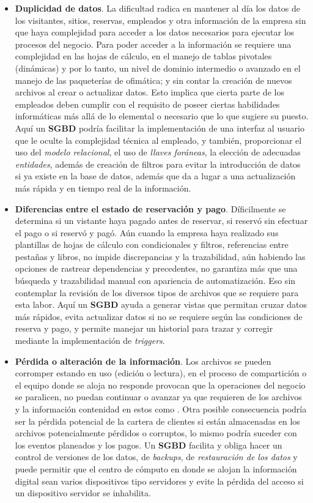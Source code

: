 \documentclass[12pt]{article}
\begin{document}
\begin{itemize}
	\item \textbf{Duplicidad de datos}. La dificultad radica en mantener al día los datos de los visitantes, sitios, reservas, empleados y otra información de la empresa sin que haya complejidad para acceder a los datos necesarios para ejecutar los procesos del negocio. Para poder acceder a la información se requiere una complejidad en las hojas de cálculo, en el manejo de tablas pivotales (dinámicas) y por lo tanto, un nivel de dominio intermedio o avanzado en el manejo de las paqueterías de ofimática; y sin contar la creación de nuevos archivos al crear o actualizar datos. Esto implica que cierta parte de los empleados deben cumplir con el requisito de poseer ciertas habilidades informáticas más allá de lo elemental o necesario que lo que sugiere su puesto. Aquí un \textbf{SGBD} podría facilitar la implementación de una interfaz al usuario que le oculte la complejidad técnica al empleado, y también, proporcionar el uso del \textit{modelo relacional}, el uso de \textit{llaves foráneas}, la elección de adecuadas \textit{entidades}, además de creación de filtros para evitar la introducción de datos si ya existe en la base de datos, además que da a lugar a una actualización más rápida y en tiempo real de la información.
	\item \textbf{Diferencias entre el estado de reservación y pago}. Díficilmente se determina si un vistante haya pagado antes de reservar, si reservó sin efectuar el pago o si reservó y pagó. Aún cuando la empresa haya realizado sus plantillas de hojas de cálculo con condicionales y filtros, referencias entre pestañas y libros, no impide discrepancias y la trazabilidad, aún habiendo las opciones de rastrear dependencias y precedentes, no garantiza más que una búsqueda y trazabilidad manual con apariencia de automatización. Eso sin contemplar la revisión de los diversos tipos de archivos que se requiere para esta labor. Aquí un  \textbf{SGBD} ayuda a generar vistas que permitan cruzar datos más rápidos, evita actualizar datos si no se requiere según las condiciones de reserva y pago, y permite manejar un historial para trazar y corregir mediante la implementación de \textit{triggers}.
	\item \textbf{Pérdida o alteración de la información}. Los archivos se pueden corromper estando en uso (edición o lectura), en el proceso de compartición o el equipo donde se aloja no responde provocan que la operaciones del negocio se paralicen, no puedan continuar o avanzar ya que requieren de los archivos y la información contenidad en estos como . Otra posible consecuencia podría ser la pérdida potencial de la cartera de clientes si están almacenadas en los archivos potencialmente pérdidos o corruptos, lo mismo podría suceder con los eventos planeados y los pagos. Un \textbf{SGBD} facilita y obliga hacer un control de versiones de los datos, de \textit{backups}, de \textit{restauración de los datos} y puede permitir que el centro de cómputo en donde se alojan la información digital sean varios dispositivos tipo servidores y evite la pérdida del acceso si un dispositivo servidor se inhabilita.

\end{itemize}
\end{document}
